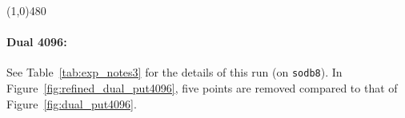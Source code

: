 \documentclass[10pt]{article}
\begin{document}
\begin{center}
\line(1,0){480}
\end{center}

\paragraph{Dual 4096:} See Table~\ref{tab:exp_notes3} for the details of this run (on {\tt sodb8}). In Figure~\ref{fig:refined_dual_put4096}, 
five points are removed compared to that of Figure~\ref{fig:dual_put4096}.

\begin{figure}[h]
	\centering
\end{figure}
\end{document}
